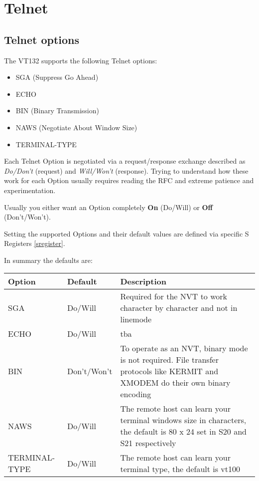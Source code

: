 
\newpage
\section{Telnet}

\subsection{Telnet options}

The VT132 supports the following Telnet options:

\begin{itemize}[leftmargin=1em]
	\item SGA (Suppress Go Ahead)
	\item ECHO
	\item BIN (Binary Transmission)
	\item NAWS (Negotiate About Window Size)
	\item TERMINAL-TYPE
\end{itemize}

Each Telnet Option is negotiated via a request/response exchange described as \textit{Do/Don't} (request) and \textit{Will/Won't} (response).
Trying to understand how these work for each Option usually requires reading the RFC and extreme patience and experimentation.

Usually you either want an Option completely \textbf{On} (Do/Will) or \textbf{Off} (Don't/Won't).

Setting the supported Options and their default values are defined via specific S Registers \vref{sregister}.

In summary the defaults are:

\begin{tabular}{p{6em} | p{5.5em} | p{}}
\hline
\textbf{Option}	& \textbf{Default}	& \textbf{Description} \\
\hline
SGA				& Do/Will		& Required for the NVT to work character by character and not in linemode \\
ECHO			& Do/Will		& tba \\
BIN				& Don't/Won't	& To operate as an NVT, binary mode is not required. File transfer protocols like KERMIT and XMODEM do their own binary encoding \\
NAWS			& Do/Will		& The remote host can learn your terminal windows size in characters, the default is 80 x 24 set in S20 and S21 respectively \\
TERMINAL-TYPE	& Do/Will		& The remote host can learn your terminal type, the default is vt100 \\
\hline
\end{tabular}
\bigskip

